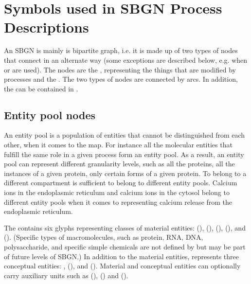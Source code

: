 \chapter{Symbols used in SBGN Process Descriptions}
\label{chp:symbols}


An SBGN \PDm is mainly is bipartite graph, i.e. it is made up of two types of nodes that connect in an alternate way (some exceptions are described below, e.g. when  or  are used). The nodes are the , representing the things that are modified by processes and the . The two types of nodes are connected by arcs. In addition, the  can be contained in . 

\section{Entity pool nodes}\label{sec:EPNs}

An entity pool is a population of entities that cannot be distinguished from each other, when it comes to the \SBGNPDLone map. For instance all the molecular entities that fulfill the same role in a given process form an entity pool. As a result, an entity pool can represent different granularity levels, such as all the proteins, all the instances of a given protein, only certain forms of a given protein. To belong to a different compartment is sufficient to belong to different entity pools. Calcium ions in the endoplasmic reticulum and calcium ions in the cytosol belong to different entity pools when it comes to representing calcium release from the endoplasmic reticulum.

The \PDl contains six glyphs representing classes of material entities:  (),  (),  (),  (), and  ().  (Specific types of macromolecules, such as protein, RNA, DNA, polysaccharide, and specific simple chemicals are not defined by \PD but may be part of future levels of SBGN.)  In addition to the material entities, \PD represents three conceptual entities: ,  (), and  ().  Material and conceptual entities can optionally carry auxiliary units such as  (),   () and  ().
% 
% 
% 
% 
% 
% 
% 
% 
% 


